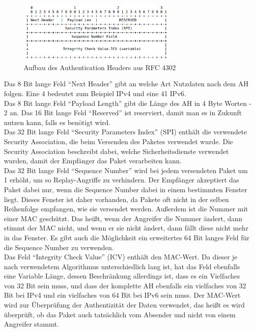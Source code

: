 \documentclass[12pt]{scrartcl}
\begin{document}
\begin{figure}[htbp] 
  \centering
     \includegraphics[width=0.7\textwidth]{AH-Aufbau.png}
  \caption{Aufbau des Authentication Headers aus RFC 4302}
  \label{AH-Aufbau}
\end{figure}

Das 8 Bit lange Feld "`Next Header"' gibt an welche Art Nutzdaten nach dem AH folgen. Eine 4 bedeutet zum Beispiel IPv4 und eine 41 IPv6.\\ 
Das 8 Bit lange Feld "`Payload Length"' gibt die Länge des AH in 4 Byte Worten - 2 an. Das 16 Bit lange Feld "`Reserved"' ist reserviert, damit man es in Zukunft nutzen kann, falls es benötigt wird.\\ 
Das 32 Bit lange Feld "`Security Parameters Index"' (SPI) enthält die verwendete Security Association, die beim Versenden des Paketes verwendet wurde. Die Security Association beschreibt dabei, welche Sicherheitsdienste verwendet wurden, damit der Empfänger das Paket verarbeiten kann.\\ 
Das 32 Bit lange Feld "`Sequence Number"' wird bei jedem versendeten Paket um 1 erhöht, um so Replay-Angriffe zu verhindern. Der Empfänger akzeptiert das Paket dabei nur, wenn die Sequence Number dabei in einem bestimmten Fenster liegt. Dieses Fenster ist daher vorhanden, da Pakete oft nicht in der selben Reihenfolge empfangen, wie sie versendet werden. Außerdem ist die Nummer mit einer MAC geschützt. Das heißt, wenn der Angreifer die Nummer ändert, dann stimmt der MAC nicht, und wenn er sie nicht ändert, dann fällt diese nicht mehr in das Fenster. Es gibt auch die Möglichkeit ein erweitertes 64 Bit langes Feld für die Sequence Number zu verwenden.\\
Das Feld "`Integrity Check Value"' (ICV) enthält den MAC-Wert. Da dieser je nach verwendetem Algorithmus unterschiedlich lang ist, hat das Feld ebenfalls eine Variable Länge, dessen Beschränkung allerdings ist, dass es ein Vielfaches von 32 Bit sein muss, und dass der komplette AH ebenfalls ein vielfaches von 32 Bit bei IPv4 und ein vielfaches von 64 Bit bei IPv6 sein muss. Der MAC-Wert wird zur Überprüfung der Authentizität der Daten verwendet, das heißt es wird überprüft, ob das Paket auch tatsächlich vom Absender und nicht von einem Angreifer stammt.
\end{document}
